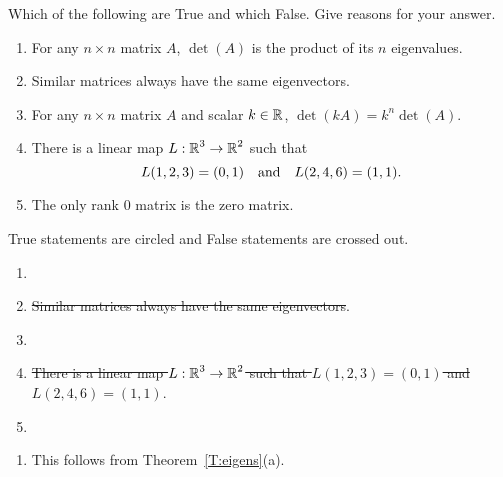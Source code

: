 \documentclass{ximera}
\author{Matthew Carr \& Marty Golubitsky}
\begin{document}

\begin{exercise}\label{mc.exercise12}
Which of the following are True and which False.  Give reasons for your answer.
\begin{enumerate}
\item For any $n \times n$ matrix $A$, $\det(A)$ is the product of its $n$ eigenvalues.
\item Similar matrices always have the same eigenvectors.
\item For any $n \times n$ matrix $A$ and scalar $k\in\mbox{$\Bbb{R}$}$, $\det(kA) = k^n \det(A)$.
\item There is a linear map $L: \mbox{$\Bbb{R}$}^3 \to \mbox{$\Bbb{R}$}^2$ such that 
\[
L(1,2,3) = (0,1) \quad\mbox{and}\quad L(2,4,6) = (1,1).
\]
\item The only rank $0$ matrix is the zero matrix.
\end{enumerate}

\begin{solution}

\ans 
True statements are circled and False statements are crossed out.


\begin{enumerate}

\item {}
\item \sout{Similar matrices always have the same eigenvectors}.
\item {}
\item \sout{There is a linear map $L: \mbox{$\Bbb{R}$}^3 \to \mbox{$\Bbb{R}$}^2$ such that $L(1,2,3) = (0,1)$ and $L(2,4,6) = (1,1)$}.
\item {}
\end{enumerate}

\soln \begin{enumerate}

\item This follows from Theorem~\ref{T:eigens}(a).


\end{enumerate}
\end{solution}
\end{exercise}
\end{document}
